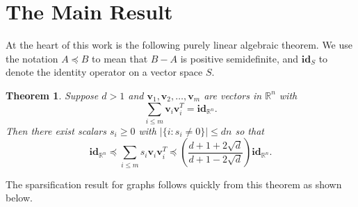 \documentclass[12pt]{article}
\renewcommand{\v}{\mathbf{v}}
\newcommand{\R}{\mathbb{R}}
\newtheorem{theorem}{Theorem}[section]
\renewcommand{\v}{\mathbf{v}}
\newcommand{\id}{\mathbf{id}}
\begin{document}
\section{The Main Result}
At the heart of this work is the following purely linear algebraic theorem.
We use the notation $A\preceq B$ to mean that $B-A$ is positive
  semidefinite, and $\id_{S}$ to denote the identity operator on a vector space $S$.
\begin{theorem}\label{thm:linalg}
Suppose $d>1$ and $\v_1,\v_2,\ldots,\v_m$ are vectors in $\R^n$ with
\[
  \sum_{i\le m}\v_i\v_i^T=\id_{\R^n}.
\]
Then there exist scalars $s_i\ge 0$ with $|\{i:s_i\neq 0\}|\le dn$ so that
\[
  \id_{\R^n} 
  \preceq \sum_{i\le m} s_i\v_i\v_i^T
  \preceq \left(\frac{d+1+2\sqrt{d}}{d+1-2\sqrt{d}}\right) \id_{\R^n}.
\]
\end{theorem}
\noindent The sparsification result for graphs follows quickly from this theorem as shown below.
\end{document}
